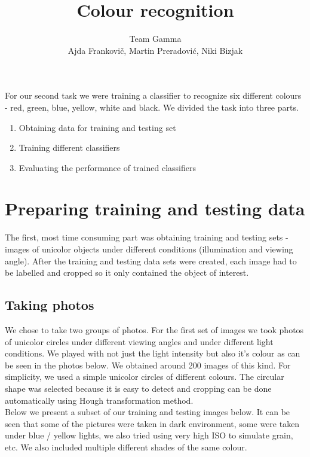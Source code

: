 \documentclass[12pt,a4paper]{article}
\author{Team Gamma \\ {\small Ajda Frankovič, Martin Preradović, Niki Bizjak}}
\title{Colour recognition}
\date{}
\begin{document}
	
	\maketitle
	
	For our second task we were training a classifier to recognize six different colours - red, green, blue, yellow, white and black. We divided the task into three parts. 

	\begin{enumerate}
		\item Obtaining data for training and testing set
		\item Training different classifiers
		\item Evaluating the performance of trained classifiers
	\end{enumerate}
		
	\section{Preparing training and testing data}

	The first, most time consuming part was obtaining training and testing sets - images of unicolor objects under different conditions (illumination and viewing angle). After the training and testing data sets were created, each image had to be labelled and cropped so it only contained the object of interest. \\

	\subsection{Taking photos}
	
	We chose to take two groups of photos. For the first set of images we took photos of unicolor circles under different viewing angles and under different light conditions. We played with not just the light intensity but also it's colour as can be seen in the photos below. We obtained around 200 images of this kind. For simplicity, we used a simple unicolor circles of different colours. The circular shape was selected because it is easy to detect and cropping can be done automatically using Hough transformation method. \\
	
	Below we present a subset of our training and testing images below. It can be seen that some of the pictures were taken in dark environment, some were taken under blue / yellow lights, we also tried using very high ISO to simulate grain, etc. We also included multiple different shades of the same colour. 
\end{document}
